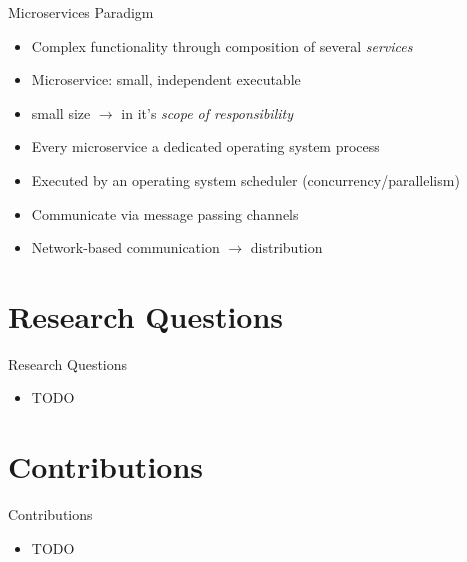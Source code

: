 \documentclass{beamer}
\begin{document}
\begin{frame}{Microservices Paradigm}

\begin{itemize}
  \item Complex functionality through composition of several \textit{services}
  \item Microservice: small, independent executable
  \item \glqq small\grqq{} size $\rightarrow$ in it's \textit{scope of responsibility}
  \item Every microservice a dedicated operating system process
  \item Executed by an operating system scheduler (concurrency/parallelism)
  \item Communicate via message passing channels
  \item Network-based communication $\rightarrow$ distribution
\end{itemize}

\end{frame}


\section{Research Questions}


\begin{frame}{Research Questions}

\begin{itemize}
  \item TODO
\end{itemize}

\end{frame}


\section{Contributions}


\begin{frame}{Contributions}

\begin{itemize}
  \item TODO
\end{itemize}

\end{frame}
\end{document}
